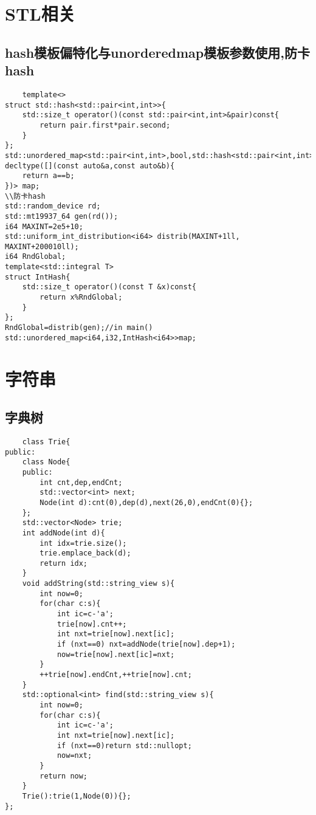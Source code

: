 \documentclass[UTF8]{ctexart}
\begin{document}
\section{STL相关}
\subsection{hash模板偏特化与unorderedmap模板参数使用,防卡hash}
\begin{lstlisting}
    template<>
struct std::hash<std::pair<int,int>>{
    std::size_t operator()(const std::pair<int,int>&pair)const{
        return pair.first*pair.second;
    }
};
std::unordered_map<std::pair<int,int>,bool,std::hash<std::pair<int,int>>, decltype([](const auto&a,const auto&b){
    return a==b;
})> map;
\\防卡hash
std::random_device rd;
std::mt19937_64 gen(rd());
i64 MAXINT=2e5+10;
std::uniform_int_distribution<i64> distrib(MAXINT+1ll, MAXINT+200010ll);
i64 RndGlobal;
template<std::integral T>
struct IntHash{
    std::size_t operator()(const T &x)const{
        return x%RndGlobal;
    }
};
RndGlobal=distrib(gen);//in main()
std::unordered_map<i64,i32,IntHash<i64>>map;
\end{lstlisting}
\section{字符串}
\subsection{字典树}
\begin{lstlisting}
    class Trie{
public:
    class Node{
    public:
        int cnt,dep,endCnt;
        std::vector<int> next;
        Node(int d):cnt(0),dep(d),next(26,0),endCnt(0){};
    };
    std::vector<Node> trie;
    int addNode(int d){
        int idx=trie.size();
        trie.emplace_back(d);
        return idx;
    }
    void addString(std::string_view s){
        int now=0;
        for(char c:s){
            int ic=c-'a';
            trie[now].cnt++;
            int nxt=trie[now].next[ic];
            if (nxt==0) nxt=addNode(trie[now].dep+1);
            now=trie[now].next[ic]=nxt;
        }
        ++trie[now].endCnt,++trie[now].cnt;
    }
    std::optional<int> find(std::string_view s){
        int now=0;
        for(char c:s){
            int ic=c-'a';
            int nxt=trie[now].next[ic];
            if (nxt==0)return std::nullopt;
            now=nxt;
        }
        return now;
    }
    Trie():trie(1,Node(0)){};
};
\end{lstlisting}
\end{document}
